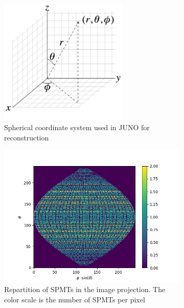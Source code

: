 \documentclass[../main.tex]{subfiles}
\begin{document}
{{\begin{figure}[ht]
  \centering
  \begin{subfigure}[t]{0.48\linewidth}
    \includegraphics[height=6cm]{images/juno/spherical_coordinate_system.png}
    \caption{Spherical coordinate system used in JUNO for reconstruction}
    \label{fig:jcnn:corrdinate_system}
  \end{subfigure}
  \hfill
  \begin{subfigure}[t]{0.48\linewidth}
    \includegraphics[width=\textwidth]{images/jcnn/pmt_repartition.png}
    \caption{Repartition of SPMTs in the image projection. The color scale is the number of SPMTs per pixel}
    \label{fig:jcnn:pmt_rep}
  \end{subfigure}
  \caption{}
\end{figure}

}}
\end{document}
